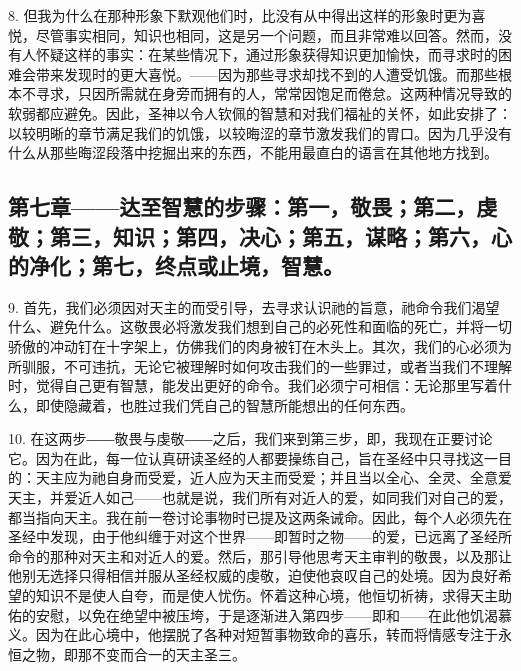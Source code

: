 8. 但我为什么在那种形象下默观他们时，比没有从中得出这样的形象时更为喜悦，尽管事实相同，知识也相同，这是另一个问题，而且非常难以回答。然而，没有人怀疑这样的事实：在某些情况下，通过形象获得知识更加愉快，而寻求时的困难会带来发现时的更大喜悦。——因为那些寻求却找不到的人遭受饥饿。而那些根本不寻求，只因所需就在身旁而拥有的人，常常因饱足而倦怠。这两种情况导致的软弱都应避免。因此，圣神以令人钦佩的智慧和对我们福祉的关怀，如此安排了：以较明晰的章节满足我们的饥饿，以较晦涩的章节激发我们的胃口。因为几乎没有什么从那些晦涩段落中挖掘出来的东西，不能用最直白的语言在其他地方找到。\par


\subsection{第七章——达至智慧的步骤：第一，敬畏；第二，虔敬；第三，知识；第四，决心；第五，谋略；第六，心的净化；第七，终点或止境，智慧。}

9. 首先，我们必须因对天主的而受引导，去寻求认识祂的旨意，祂命令我们渴望什么、避免什么。这敬畏必将激发我们想到自己的必死性和面临的死亡，并将一切骄傲的冲动钉在十字架上，仿佛我们的肉身被钉在木头上。其次，我们的心必须为所驯服，不可违抗，无论它被理解时如何攻击我们的一些罪过，或者当我们不理解时，觉得自己更有智慧，能发出更好的命令。我们必须宁可相信：无论那里写着什么，即使隐藏着，也胜过我们凭自己的智慧所能想出的任何东西。\par

10. 在这两步――敬畏与虔敬――之后，我们来到第三步，即，我现在正要讨论它。因为在此，每一位认真研读圣经的人都要操练自己，旨在圣经中只寻找这一目的：天主应为祂自身而受爱，近人应为天主而受爱；并且当以全心、全灵、全意爱天主，并爱近人如己——也就是说，我们所有对近人的爱，如同我们对自己的爱，都当指向天主。我在前一卷讨论事物时已提及这两条诫命。因此，每个人必须先在圣经中发现，由于他纠缠于对这个世界——即暂时之物——的爱，已远离了圣经所命令的那种对天主和对近人的爱。然后，那引导他思考天主审判的敬畏，以及那让他别无选择只得相信并服从圣经权威的虔敬，迫使他哀叹自己的处境。因为良好希望的知识不是使人自夸，而是使人忧伤。怀着这种心境，他恒切祈祷，求得天主助佑的安慰，以免在绝望中被压垮，于是逐渐进入第四步——即和——在此他饥渴慕义。因为在此心境中，他摆脱了各种对短暂事物致命的喜乐，转而将情感专注于永恒之物，即那不变而合一的天主圣三。\par

